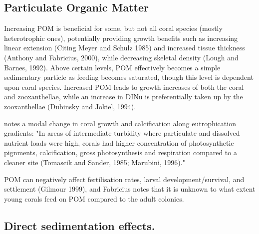 \documentclass[11pt,a4paper]{article}
\begin{document}
\subsection{Particulate Organic Matter}

Increasing POM is beneficial for some, but not all coral species (mostly heterotrophic ones), potentially providing growth benefits such as increasing linear extension (Citing Meyer and Schulz 1985) and increased tissue thickness (Anthony and Fabricius, 2000), while decreasing skeletal density (Lough and Barnes, 1992).
 Above certain levels, POM effectively becomes a simple sedimentary particle as feeding becomes saturated, though this level is dependent upon coral species.
  Increased POM leads to growth increases of both the coral and zooxanthellae, while an increase in DINu is preferentially taken up by the zooxanthellae (Dubinsky and Jokiel, 1994).

\cite{Fabricius2005} notes a modal change in coral growth and calcification along eutrophication gradients: "In areas of intermediate turbidity where particulate and dissolved nutrient loads were high, corals had higher concentration of photosynthetic pignments, calcification, gross photosynthesis and respiration compared to a cleaner site (Tomascik and Sander, 1985; Marubini, 1996)." 

POM can negatively affect fertilisation rates, larval development/survival, and settlement (Gilmour 1999), and Fabricius notes that it is unknown to what extent young corals feed on POM compared to the adult colonies.


\subsection{Direct sedimentation effects.}
\end{document}
